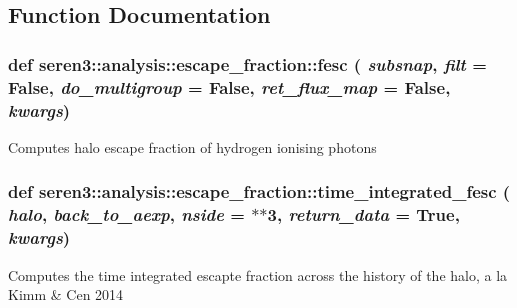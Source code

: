 \subsection{Function Documentation}
\hypertarget{namespaceseren3_1_1analysis_1_1escape__fraction_a507b1414c2915fb5cafcc02ae4762f05}{
\subsubsection[{fesc}]{\setlength{\rightskip}{0pt plus 5cm}def seren3::analysis::escape\_\-fraction::fesc ( {\em subsnap}, \/   {\em filt} = {\ttfamily False}, \/   {\em do\_\-multigroup} = {\ttfamily False}, \/   {\em ret\_\-flux\_\-map} = {\ttfamily False}, \/   {\em kwargs})}}
\label{namespaceseren3_1_1analysis_1_1escape__fraction_a507b1414c2915fb5cafcc02ae4762f05}
\begin{DoxyVerb}
Computes halo escape fraction of hydrogen ionising photons
\end{DoxyVerb}
 \hypertarget{namespaceseren3_1_1analysis_1_1escape__fraction_ae28fa7f0028e3796234f82f24ba4f2e5}{
\subsubsection[{time\_\-integrated\_\-fesc}]{\setlength{\rightskip}{0pt plus 5cm}def seren3::analysis::escape\_\-fraction::time\_\-integrated\_\-fesc ( {\em halo}, \/   {\em back\_\-to\_\-aexp}, \/   {\em nside} = {$\ast$$\ast$3}, \/   {\em return\_\-data} = {\ttfamily True}, \/   {\em kwargs})}}
\label{namespaceseren3_1_1analysis_1_1escape__fraction_ae28fa7f0028e3796234f82f24ba4f2e5}
\begin{DoxyVerb}
Computes the time integrated escapte fraction across
the history of the halo, a la Kimm & Cen 2014
\end{DoxyVerb}
 